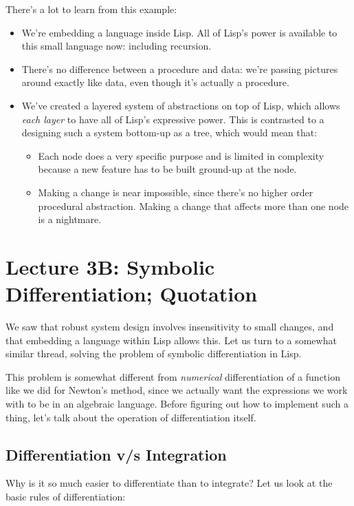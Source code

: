 \documentclass[9pt]{report}
\begin{document}
There's a lot to learn from this example:
\begin{itemize}
\item We're embedding a language inside Lisp. All of Lisp's power is
available to this small language now: including recursion.
\item There's no difference between a procedure and data: we're
passing pictures around exactly like data, even though it's
actually a procedure.
\item We've created a layered system of abstractions on top of Lisp,
which allows \emph{each layer} to have all of Lisp's expressive
power. This is contrasted to a designing such a system bottom-up
as a tree, which would mean that:
\begin{itemize}
\item Each node does a very specific purpose and is limited in
complexity because a new feature has to be built ground-up at
the node.
\item Making a change is near impossible, since there's no higher
order procedural abstraction. Making a change that affects
more than one node is a nightmare.
\end{itemize}
\end{itemize}

\chapter{Lecture 3B: Symbolic Differentiation; Quotation}
\label{sec:org7580586}

We saw that robust system design involves insensitivity to small
changes, and that embedding a language within Lisp allows this. Let
us turn to a somewhat similar thread, solving the problem of
symbolic differentiation in Lisp.

This problem is somewhat different from \emph{numerical} differentiation
of a function like we did for Newton's method, since we actually
want the expressions we work with to be in an algebraic language.
Before figuring out how to implement such a thing, let's talk about
the operation of differentiation itself.

\section{Differentiation v/s Integration}
\label{sec:org0a1682f}

Why is it so much easier to differentiate than to integrate?
Let us look at the basic rules of differentiation:
\end{document}
